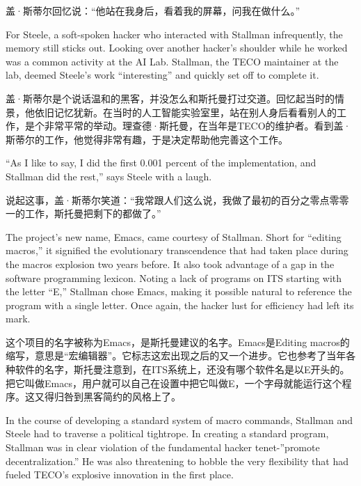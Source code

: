 \ifdefined\chs
盖·斯蒂尔回忆说：``他站在我身后，看着我的屏幕，问我在做什么。''
\fi

\ifdefined\eng
For Steele, a soft-spoken hacker who interacted with Stallman infrequently, the memory still sticks out. Looking over another hacker's shoulder while he worked was a common activity at the AI Lab. Stallman, the TECO maintainer at the lab, deemed Steele's work ``interesting'' and quickly set off to complete it.
\fi

\ifdefined\chs
盖·斯蒂尔是个说话温和的黑客，并没怎么和斯托曼打过交道。回忆起当时的情景，他依旧记忆犹新。在当时的人工智能实验室里，站在别人身后看看别人的工作，是个非常平常的举动。理查德·斯托曼，在当年是TECO的维护者。看到盖·斯蒂尔的工作，他觉得非常有趣，于是决定帮助他完善这个工作。
\fi

\ifdefined\eng
``As I like to say, I did the first 0.001 percent of the implementation, and Stallman did the rest,'' says Steele with a laugh.
\fi

\ifdefined\chs
说起这事，盖·斯蒂尔笑道：``我常跟人们这么说，我做了最初的百分之零点零零一的工作，斯托曼把剩下的都做了。''
\fi

\ifdefined\eng
The project's new name, Emacs, came courtesy of Stallman. Short for ``editing macros,'' it signified the evolutionary transcendence that had taken place during the macros explosion two years before. It also took advantage of a gap in the software programming lexicon. Noting a lack of programs on ITS starting with the letter ``E,'' Stallman chose Emacs, making it \ifdefined\vone possible \fi\ifdefined\vtwo natural \fi to reference the program with a single letter. Once again, the hacker lust for efficiency had left its mark.
\fi

\ifdefined\chs
这个项目的名字被称为Emacs，是斯托曼建议的名字。Emacs是Editing macros的缩写，意思是``宏编辑器''。它标志这宏出现之后的又一个进步。它也参考了当年各种软件的名字，斯托曼注意到，在ITS系统上，还没有哪个软件名是以E开头的。把它叫做Emacs，用户就可以自己在设置中把它叫做E，一个字母就能运行这个程序。这又得归咎到黑客简约的风格上了。
\fi

\ifdefined\vone
\ifdefined\eng
In the course of developing a standard system of macro commands, Stallman and Steele had to traverse a political tightrope. In creating a standard program, Stallman was in clear violation of the fundamental hacker tenet-''promote decentralization.'' He was also threatening to hobble the very flexibility that had fueled TECO's explosive innovation in the first place.
\fi

